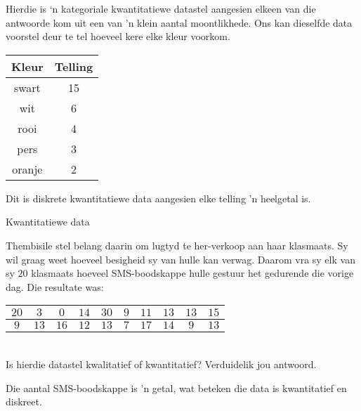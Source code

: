Hierdie is ‘n kategoriale kwantitatiewe datastel aangesien elkeen van die antwoorde kom uit een van ’n klein aantal moontlikhede. Ons kan dieselfde data voorstel deur te tel hoeveel kere elke kleur voorkom.

  \begin{center}
    \begin{tabular}{|c|c|}\hline
      
      \textbf{Kleur} & \textbf{Telling} \\ \hline

      swart & 15 \\ \hline
      wit & 6 \\\hline
      rooi & 4 \\\hline
      pers & 3 \\\hline
      oranje & 2\\
    \hline
    \end{tabular}
  \end{center}

  Dit is diskrete kwantitatiewe data aangesien elke telling 'n heelgetal is.

\begin{wex}{Kwantitatiewe data}
{Thembisile stel belang daarin om lugtyd te her-verkoop aan haar klasmaats. Sy wil graag weet hoeveel besigheid sy van hulle kan verwag. Daarom vra sy elk van sy $20$ klasmaats hoeveel SMS-boodskappe hulle gestuur het gedurende die vorige dag. Die resultate was:
\\

    \begin{center}
      \begin{tabular}{|c|c|c|c|c|c|c|c|c|c|}\hline
        $20$ & $ 3$ & $ 0$ & $14$ & $30$ & $9$ & $11$ & $13$ & $13$ & $15$ \\ \hline
         $9$ & $13$ & $16$ & $12$ & $13$ & $7$ & $17$ & $14$ & $ 9$ & $13$ \\ \hline
        
      \end{tabular}
    \end{center}
    \vspace{8pt}\\

    Is hierdie datastel kwalitatief of kwantitatief? Verduidelik jou antwoord.
}{

  Die aantal SMS-boodskappe is 'n getal, wat beteken die data is kwantitatief en diskreet.
}
\end{wex}

